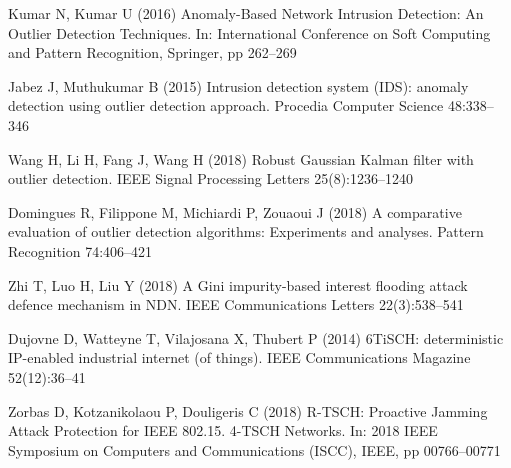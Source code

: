 \documentclass[]{svjour3}                     %
\begin{document}
\begin{thebibliography}{57}
	Kumar N, Kumar U (2016) {Anomaly-Based Network Intrusion Detection: An Outlier
		Detection Techniques}. In: International Conference on Soft Computing and
	Pattern Recognition, Springer, pp 262--269
	
	Jabez J, Muthukumar B (2015) {Intrusion detection system (IDS): anomaly
		detection using outlier detection approach}. Procedia Computer Science
	48:338--346
	
	Wang H, Li H, Fang J, Wang H (2018) {Robust Gaussian Kalman filter with outlier
		detection}. IEEE Signal Processing Letters 25(8):1236--1240
	
	Domingues R, Filippone M, Michiardi P, Zouaoui J (2018) {A comparative
		evaluation of outlier detection algorithms: Experiments and analyses}.
	Pattern Recognition 74:406--421
	
	Zhi T, Luo H, Liu Y (2018) {A Gini impurity-based interest flooding attack
		defence mechanism in NDN}. IEEE Communications Letters 22(3):538--541
	
	Dujovne D, Watteyne T, Vilajosana X, Thubert P (2014) {6TiSCH: deterministic
		IP-enabled industrial internet (of things)}. IEEE Communications Magazine
	52(12):36--41
	
	Zorbas D, Kotzanikolaou P, Douligeris C (2018) {R-TSCH: Proactive Jamming
		Attack Protection for IEEE 802.15. 4-TSCH Networks}. In: 2018 IEEE Symposium
	on Computers and Communications (ISCC), IEEE, pp 00766--00771
	
\end{thebibliography}
\end{document}
